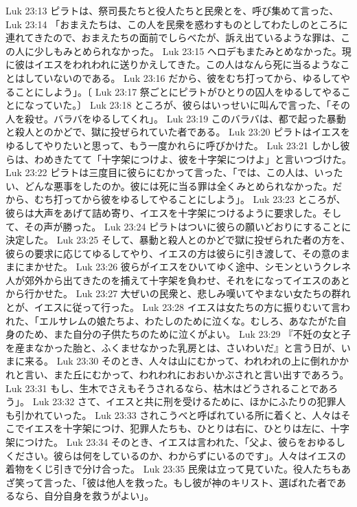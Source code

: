 Luk 23:13  ピラトは、祭司長たちと役人たちと民衆とを、呼び集めて言った、
Luk 23:14  「おまえたちは、この人を民衆を惑わすものとしてわたしのところに連れてきたので、おまえたちの面前でしらべたが、訴え出ているような罪は、この人に少しもみとめられなかった。
Luk 23:15  ヘロデもまたみとめなかった。現に彼はイエスをわれわれに送りかえしてきた。この人はなんら死に当るようなことはしていないのである。
Luk 23:16  だから、彼をむち打ってから、ゆるしてやることにしよう」。〔
Luk 23:17  祭ごとにピラトがひとりの囚人をゆるしてやることになっていた。〕
Luk 23:18  ところが、彼らはいっせいに叫んで言った、「その人を殺せ。バラバをゆるしてくれ」。
Luk 23:19  このバラバは、都で起った暴動と殺人とのかどで、獄に投ぜられていた者である。
Luk 23:20  ピラトはイエスをゆるしてやりたいと思って、もう一度かれらに呼びかけた。
Luk 23:21  しかし彼らは、わめきたてて「十字架につけよ、彼を十字架につけよ」と言いつづけた。
Luk 23:22  ピラトは三度目に彼らにむかって言った、「では、この人は、いったい、どんな悪事をしたのか。彼には死に当る罪は全くみとめられなかった。だから、むち打ってから彼をゆるしてやることにしよう」。
Luk 23:23  ところが、彼らは大声をあげて詰め寄り、イエスを十字架につけるように要求した。そして、その声が勝った。
Luk 23:24  ピラトはついに彼らの願いどおりにすることに決定した。
Luk 23:25  そして、暴動と殺人とのかどで獄に投ぜられた者の方を、彼らの要求に応じてゆるしてやり、イエスの方は彼らに引き渡して、その意のままにまかせた。
Luk 23:26  彼らがイエスをひいてゆく途中、シモンというクレネ人が郊外から出てきたのを捕えて十字架を負わせ、それをになってイエスのあとから行かせた。
Luk 23:27  大ぜいの民衆と、悲しみ嘆いてやまない女たちの群れとが、イエスに従って行った。
Luk 23:28  イエスは女たちの方に振りむいて言われた、「エルサレムの娘たちよ、わたしのために泣くな。むしろ、あなたがた自身のため、また自分の子供たちのために泣くがよい。
Luk 23:29  『不妊の女と子を産まなかった胎と、ふくませなかった乳房とは、さいわいだ』と言う日が、いまに来る。
Luk 23:30  そのとき、人々は山にむかって、われわれの上に倒れかかれと言い、また丘にむかって、われわれにおおいかぶされと言い出すであろう。
Luk 23:31  もし、生木でさえもそうされるなら、枯木はどうされることであろう」。
Luk 23:32  さて、イエスと共に刑を受けるために、ほかにふたりの犯罪人も引かれていった。
Luk 23:33  されこうべと呼ばれている所に着くと、人々はそこでイエスを十字架につけ、犯罪人たちも、ひとりは右に、ひとりは左に、十字架につけた。
Luk 23:34  そのとき、イエスは言われた、「父よ、彼らをおゆるしください。彼らは何をしているのか、わからずにいるのです」。人々はイエスの着物をくじ引きで分け合った。
Luk 23:35  民衆は立って見ていた。役人たちもあざ笑って言った、「彼は他人を救った。もし彼が神のキリスト、選ばれた者であるなら、自分自身を救うがよい」。
